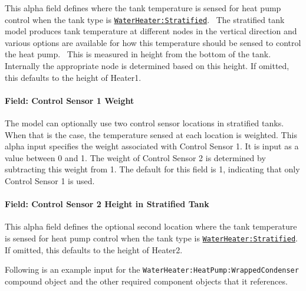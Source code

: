 This alpha field defines where the tank temperature is sensed for heat pump control when the tank type is \hyperref[waterheaterstratified]{\lstinline!WaterHeater:Stratified!}.~ The stratified tank model produces tank temperature at different nodes in the vertical direction and various options are available for how this temperature should be sensed to control the heat pump.~ This is measured in height from the bottom of the tank. Internally the appropriate node is determined based on this height. If omitted, this defaults to the height of Heater1.

\paragraph{Field: Control Sensor 1 Weight}\label{field-control-sensor-1-weight-1}

The model can optionally use two control sensor locations in stratified tanks. When that is the case, the temperature sensed at each location is weighted. This alpha input specifies the weight associated with Control Sensor 1. It is input as a value between 0 and 1. The weight of Control Sensor 2 is determined by subtracting this weight from 1. The default for this field is 1, indicating that only Control Sensor 1 is used.

\paragraph{Field: Control Sensor 2 Height in Stratified Tank}\label{field-control-sensor-2-height-in-stratified-tank-1}

This alpha field defines the optional second location where the tank temperature is sensed for heat pump control when the tank type is \hyperref[waterheaterstratified]{\lstinline!WaterHeater:Stratified!}. If omitted, this defaults to the height of Heater2.

Following is an example input for the \lstinline!WaterHeater:HeatPump:WrappedCondenser! compound object and the other required component objects that it references.

